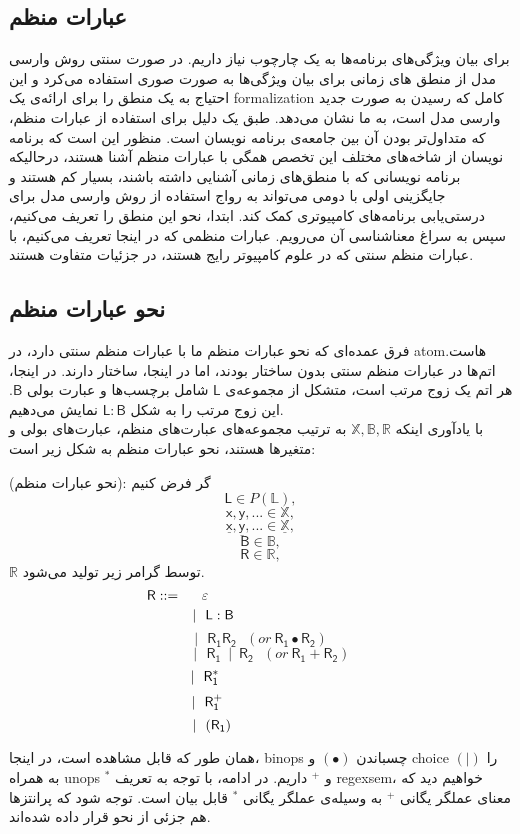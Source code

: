 \subsection{عبارات منظم}
برای بیان ویژگی‌های برنامه‌ها به یک چارچوب نیاز داریم. در صورت سنتی روش وارسی مدل از منطق های زمانی برای بیان ویژگی‌ها به صورت صوری استفاده می‌کرد و این احتیاج به یک منطق را برای ارائه‌ی یک \gls*{formalization} کامل که رسیدن به صورت جدید وارسی مدل است، به ما نشان می‌دهد. طبق \cite{calcul} یک دلیل برای استفاده از عبارات منظم، که متداول‌تر بودن آن بین جامعه‌ی برنامه نویسان است. منظور این است که برنامه نویسان از شاخه‌های مختلف این تخصص همگی با عبارات منظم آشنا هستند، درحالیکه برنامه نویسانی که با منطق‌های زمانی آشنایی داشته باشند، بسیار کم هستند و جایگزینی اولی با دومی می‌تواند به رواج استفاده از روش وارسی مدل برای درستی‌یابی برنامه‌های کامپیوتری کمک کند. ابتدا، نحو این منطق را تعریف می‌کنیم، سپس به سراغ معناشناسی آن می‌رویم. عبارات منظمی که در اینجا تعریف می‌کنیم، با عبارات منظم سنتی که در علوم کامپیوتر رایج هستند، در جزئیات متفاوت هستند. 
\subsection{نحو عبارات منظم}
فرق عمده‌ای که نحو عبارات منظم ما با عبارات منظم سنتی دارد، در \gls{atom}هاست. اتم‌ها در عبارات منظم سنتی بدون ساختار بودند، اما در اینجا، ساختار دارند. در اینجا، هر اتم یک زوج مرتب است، متشکل از مجموعه‌ی $\mathsf{L}$ شامل برچسب‌ها و عبارت بولی $\mathsf{B}$. این زوج مرتب را به شکل 
$\mathsf{L : B}$
نمایش می‌دهیم.\\ 
با یادآوری اینکه 
$\mathbb{X,B,R}$
به ترتیب مجموعه‌های عبارت‌های منظم، عبارت‌های بولی و متغیرها هستند، نحو عبارات منظم به شکل زیر است:
\begin{defn}
	(نحو عبارات منظم): گر فرض کنیم
$$\mathsf{L} \in \mathit{P}(\mathbb{L}),$$        
$$\mathsf{x,y,...} \in \mathbb{X},$$
$$\mathsf{\underline{x},\underline{y},...} \in \mathbb{\underline{X}},$$
$$\mathsf{B} \in \mathbb{B},$$
$$\mathsf{R} \in \mathbb{R},$$
$\mathbb{R}$ توسط گرامر زیر تولید می‌شود.
$$\mathsf{R} ::=\hspace{0.5cm} \varepsilon\hspace{4.2cm}$$
$$|\:\:\:\mathsf{L : B}\hspace{2.4cm}$$
$$|\:\:\:\mathsf{R_1 R_2}\:\:\:(or\:\mathsf{R_1 \bullet R_2 })$$
$$\:\:\:\:\:\:\:|\:\:\:\mathsf{R_1\:\mid\:R_2}\:\:\:(or\:\mathsf{R_1 + R_2 })$$
$$|\:\:\:\mathsf{R_1^*}\hspace{2.8cm}$$
$$|\:\:\:\mathsf{R_1^+}\hspace{2.7cm}$$
$$|\:\:\:(\mathsf{R_1})\hspace{2.47cm}$$
\end{defn}
همان طور که قابل مشاهده است، در اینجا، \glspl*{binop} چسباندن
$(\bullet)$
 و \gls{choice}
$(|)$
 را به همراه \glspl*{unop}
$^*$
و
$^+$
داریم.
در ادامه، با توجه به تعریف \gls{regexsem}، خواهیم دید که معنای عملگر یگانی 
$^+$
به وسیله‌ی عملگر یگانی $^*$ قابل بیان است.
توجه شود که پرانتزها هم جزئی از نحو قرار داده شده‌اند.


